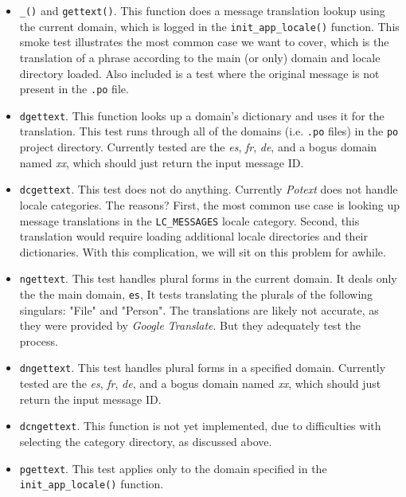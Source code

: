   \begin{itemize}
      \item \texttt{\_()} and \texttt{gettext()}.
         This function does a message translation lookup using
         the current domain, which is logged in the
         \texttt{init\_app\_locale()} function.
         This smoke test illustrates the most common case we want to
         cover, which is the translation of a phrase according to
         the main (or only) domain and locale directory loaded.
         Also included is a test where the original message is not
         present in the \texttt{.po} file.
      \item \texttt{dgettext}.
         This function looks up a domain's dictionary and uses it
         for the translation.
         This test runs through all of the domains (i.e. \texttt{.po}
         files) in the \texttt{po} project directory.
         Currently tested are the \textsl{es}, \textsl{fr}, \textsl{de},
         and a bogus domain named \textsl{xx}, which should just return
         the input message ID.
      \item \texttt{dcgettext}.
         This test does not do anything.
         Currently \textsl{Potext} does not handle locale categories.
         The reasons? First, the most common use case is looking up
         message translations in the \texttt{LC\_MESSAGES} locale category.
         Second, this translation would require loading additional locale
         directories and their dictionaries.
         With this complication, we will sit on this problem for awhile.
      \item \texttt{ngettext}.
         This test handles plural forms in the current domain.
         It deals only the the main domain, \texttt{es},
         It tests translating the plurals of the following singulars:
         "File" and "Person". 
         The translations are likely not accurate, as they were provided
         by \textsl{Google Translate}.
         But they adequately test the process.
      \item \texttt{dngettext}.
         This test handles plural forms in a specified domain.
         Currently tested are the \textsl{es}, \textsl{fr}, \textsl{de},
         and a bogus domain named \textsl{xx}, which should just return
         the input message ID.
      \item \texttt{dcngettext}.
         This function is not yet implemented, due to difficulties
         with selecting the category directory, as discussed above.
      \item \texttt{pgettext}.
         This test applies only to the domain specified in the
         \texttt{init\_app\_locale()} function.
   \end{itemize}

